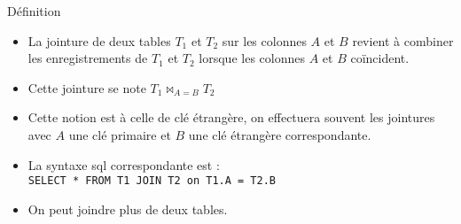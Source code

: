 \documentclass[10pt]{beamer}
\begin{document}
\begin{frame}{\Ctitle}{\stitle}
	\begin{block}{Définition}
		\begin{itemize}
			\item<1-> La jointure de deux tables $T_1$ et $T_2$ sur les colonnes $A$ et $B$ revient à combiner les enregistrements de $T_1$ et $T_2$ lorsque les colonnes $A$ et $B$ coïncident.
			\item<2-> Cette jointure se note $T_1 \Join_{A=B} T_2$
			\item<3-> Cette notion est à celle de clé étrangère, on effectuera souvent les jointures avec $A$ une clé primaire et $B$ une clé étrangère correspondante.
			\item<4-> La syntaxe {\sc sql} correspondante est : \\ \texttt{SELECT * FROM T1 JOIN T2 on T1.A = T2.B}
			\item<5-> On peut joindre plus de deux tables.
		\end{itemize}
	\end{block}
\end{frame}
\end{document}
